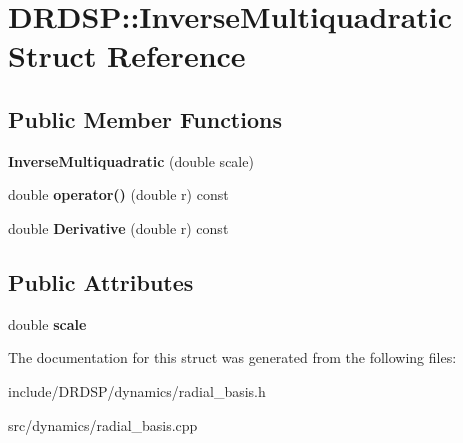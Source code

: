 \hypertarget{struct_d_r_d_s_p_1_1_inverse_multiquadratic}{\section{D\-R\-D\-S\-P\-:\-:Inverse\-Multiquadratic Struct Reference}
\label{struct_d_r_d_s_p_1_1_inverse_multiquadratic}
}
\subsection*{Public Member Functions}
\begin{DoxyCompactItemize}
\item 
\hypertarget{struct_d_r_d_s_p_1_1_inverse_multiquadratic_a9de4a748cfda8c1bd8c0dfca408faed7}{{\bfseries Inverse\-Multiquadratic} (double scale)}\label{struct_d_r_d_s_p_1_1_inverse_multiquadratic_a9de4a748cfda8c1bd8c0dfca408faed7}

\item 
\hypertarget{struct_d_r_d_s_p_1_1_inverse_multiquadratic_a513dbe313c51ad9ba2c9397c987563f7}{double {\bfseries operator()} (double r) const }\label{struct_d_r_d_s_p_1_1_inverse_multiquadratic_a513dbe313c51ad9ba2c9397c987563f7}

\item 
\hypertarget{struct_d_r_d_s_p_1_1_inverse_multiquadratic_af6a5298e54581ec417a06335c3757744}{double {\bfseries Derivative} (double r) const }\label{struct_d_r_d_s_p_1_1_inverse_multiquadratic_af6a5298e54581ec417a06335c3757744}

\end{DoxyCompactItemize}
\subsection*{Public Attributes}
\begin{DoxyCompactItemize}
\item 
\hypertarget{struct_d_r_d_s_p_1_1_inverse_multiquadratic_a39009875f833958785889ac9373ad37c}{double {\bfseries scale}}\label{struct_d_r_d_s_p_1_1_inverse_multiquadratic_a39009875f833958785889ac9373ad37c}

\end{DoxyCompactItemize}


The documentation for this struct was generated from the following files\-:\begin{DoxyCompactItemize}
\item 
include/\-D\-R\-D\-S\-P/dynamics/radial\-\_\-basis.\-h\item 
src/dynamics/radial\-\_\-basis.\-cpp\end{DoxyCompactItemize}
